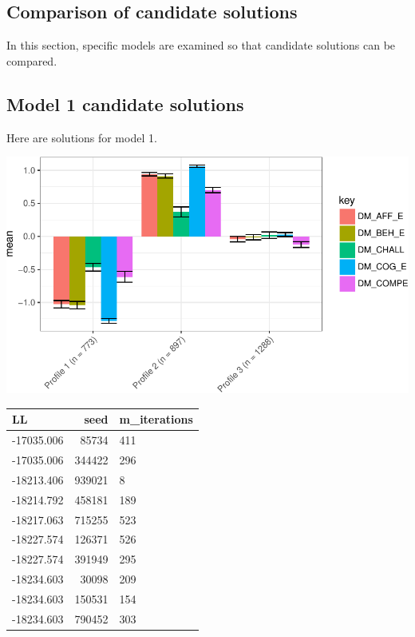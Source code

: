 \documentclass[]{msu-thesis}
\theoremstyle{definition}
\theoremstyle{definition}
\theoremstyle{definition}
\theoremstyle{remark}
\begin{document}
\subsection{Comparison of candidate
solutions}\label{comparison-of-candidate-solutions}

In this section, specific models are examined so that candidate
solutions can be compared.

\subsection{Model 1 candidate
solutions}\label{model-1-candidate-solutions}

Here are solutions for model 1.

\begin{center}\includegraphics[width=0.8\linewidth]{rosenberg-dissertation_files/figure-latex/m1_3p-1} \end{center}

\begin{tabular}{l|r|l}
\hline
LL & seed & m\_iterations\\
\hline
-17035.006 & 85734 & 411\\
\hline
-17035.006 & 344422 & 296\\
\hline
-18213.406 & 939021 & 8\\
\hline
-18214.792 & 458181 & 189\\
\hline
-18217.063 & 715255 & 523\\
\hline
-18227.574 & 126371 & 526\\
\hline
-18227.574 & 391949 & 295\\
\hline
-18234.603 & 30098 & 209\\
\hline
-18234.603 & 150531 & 154\\
\hline
-18234.603 & 790452 & 303\\
\hline
\end{tabular}
\end{document}
